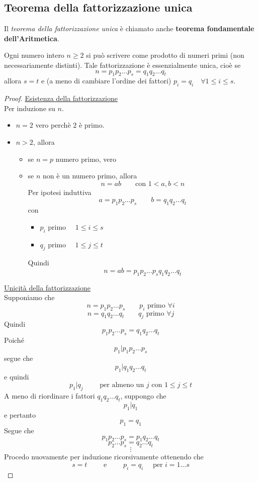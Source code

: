 \documentclass[a4paper,12pt, oneside]{book}
\begin{document}
\subsection{Teorema della fattorizzazione unica}
Il \textit{teorema della fattorizzazione unica} è chiamato anche \textbf{teorema fondamentale dell'Aritmetica}.
\begin{teorema}
	Ogni numero intero $n \geq 2$ si può scrivere come prodotto di numeri primi (non necessariamente distinti).
	Tale fattorizzazione è essenzialmente unica, cioè se
	$$n = p_1 p_2 \dots p_s = q_1 q_2 \dots q_t$$
	allora $s=t$ e (a meno di cambiare l'ordine dei fattori) $p_i = q_i \quad \forall 1 \leq i \leq s$.

	\begin{proof}
		\underline{Esistenza della fattorizzazione}\\
		Per induzione su $n$.
		\begin{itemize}
			\item $n=2$ vero perchè $2$ è primo.
			\item $n>2$, allora \begin{itemize}
				      \item se $n=p$ numero primo, vero
				      \item se $n$ non è un numero primo, allora
				            $$n=ab \qquad \mbox{con } 1 < a,b < n$$
				            Per ipotesi induttiva
				            $$a=p_1p_2 \dots p_s \qquad b = q_1q_2 \dots q_t$$
				            con \begin{itemize}
					            \item $p_i \mbox{ primo } \quad 1 \leq i \leq s$
					            \item $q_j \mbox{ primo } \quad 1 \leq j \leq t$
				            \end{itemize}
				            Quindi
				            $$n = ab = p_1 p_2 \dots p_s q_1 q_2 \dots q_t$$
			      \end{itemize}
		\end{itemize}
		\underline{Unicità della fattorizzazione}\\
		Supponiamo che
		$$n = p_1p_2 \dots p_s \qquad p_i \mbox{ primo } \forall i$$
		$$n = q_1q_2 \dots q_t \qquad q_j \mbox{ primo } \forall j$$
		Quindi
		$$p_1p_2 \dots p_s = q_1q_2 \dots q_t$$
		Poiché
		$$p_1 | p_1 p_2 \dots p_s$$
		segue che
		$$p_1 | q_1 q_2 \dots q_t$$
		e quindi
		$$p_1 | q_j \qquad \mbox{ per almeno un } j \mbox{ con } 1 \leq j \leq t$$
		A meno di riordinare i fattori $q_1q_2 \dots q_t$, suppongo che
		$$p_1 | q_1$$ e pertanto $$p_1 = q_1$$
		Segue che
		$$p_1 p_2 \dots p_s = p_1 q_2 \dots q_t$$
		$$p_2 \dots p_s = q_2 \dots q_t$$
		$$\vdots$$
		Procedo nuovamente per induzione ricorsivamente ottenendo che
		$$s=t \qquad \mbox{ e } \qquad p_i = q_i \quad \mbox{ per } i = 1 \dots s$$

	\end{proof}
\end{teorema}
\end{document}
